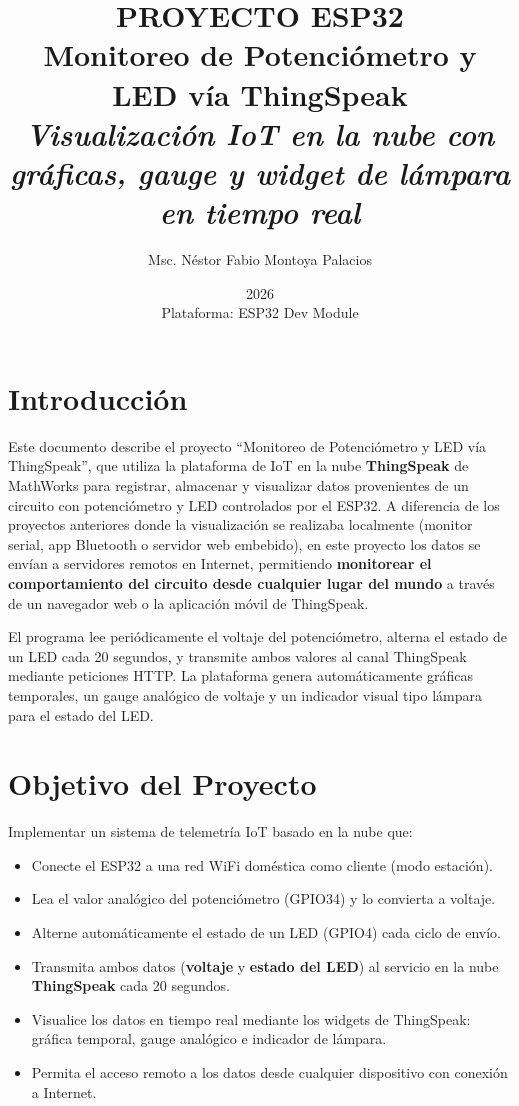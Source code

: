 \documentclass[12pt,a4paper]{article}
\title{\Huge\textbf{PROYECTO ESP32} \\ \Large Monitoreo de Potenciómetro y LED vía ThingSpeak \\ \vspace{0.5cm} \normalsize \textit{Visualización IoT en la nube con gráficas, gauge y widget de lámpara en tiempo real}}
\author{Msc. Néstor Fabio Montoya Palacios}
\date{2026 \\ \vspace{0.2cm} \small Plataforma: ESP32 Dev Module}
\begin{document}
\maketitle
\tableofcontents
\newpage

\section{Introducción}

Este documento describe el proyecto ``Monitoreo de Potenciómetro y LED vía ThingSpeak'', que utiliza la plataforma de IoT en la nube \textbf{ThingSpeak} de MathWorks para registrar, almacenar y visualizar datos provenientes de un circuito con potenciómetro y LED controlados por el ESP32. A diferencia de los proyectos anteriores donde la visualización se realizaba localmente (monitor serial, app Bluetooth o servidor web embebido), en este proyecto los datos se envían a servidores remotos en Internet, permitiendo \textbf{monitorear el comportamiento del circuito desde cualquier lugar del mundo} a través de un navegador web o la aplicación móvil de ThingSpeak.

El programa lee periódicamente el voltaje del potenciómetro, alterna el estado de un LED cada 20 segundos, y transmite ambos valores al canal ThingSpeak mediante peticiones HTTP. La plataforma genera automáticamente gráficas temporales, un gauge analógico de voltaje y un indicador visual tipo lámpara para el estado del LED.

\section{Objetivo del Proyecto}

Implementar un sistema de telemetría IoT basado en la nube que:
\begin{itemize}
    \item Conecte el ESP32 a una red WiFi doméstica como cliente (modo estación).
    \item Lea el valor analógico del potenciómetro (GPIO34) y lo convierta a voltaje.
    \item Alterne automáticamente el estado de un LED (GPIO4) cada ciclo de envío.
    \item Transmita ambos datos (\textbf{voltaje} y \textbf{estado del LED}) al servicio en la nube \textbf{ThingSpeak} cada 20 segundos.
    \item Visualice los datos en tiempo real mediante los widgets de ThingSpeak: gráfica temporal, gauge analógico e indicador de lámpara.
    \item Permita el acceso remoto a los datos desde cualquier dispositivo con conexión a Internet.
\end{itemize}
\end{document}
